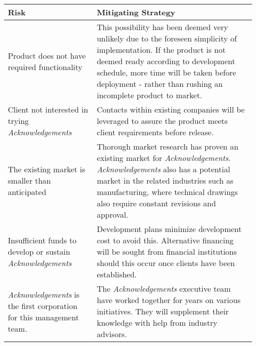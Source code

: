 \begin{center} \begin{tabular}{| p{2in} | p{3.6in} | }
    \hline
    {\bf Risk} & {\bf Mitigating Strategy} \\ \hline
	
	{Product does not have required functionality} & 
	{This possibility has been deemed very unlikely due to the foreseen simplicity of implementation. If the product is not deemed ready according to development schedule, more time will be taken before deployment - rather than rushing an incomplete product to market.} \\ \hline
	
	{\raggedright Client not interested in trying {\it Acknowledgements}} & 
	{Contacts within existing companies will be leveraged to assure the product meets client requirements before release.} \\ \hline
	
	{The existing market is smaller than anticipated} & 
	{Thorough market research has proven an existing market for {\it Acknowledgements}. {\it Acknowledgements} also has a potential market in the related industries such as manufacturing, where technical drawings also require constant revisions and approval.} \\ \hline
	
	{Insufficient funds to develop or sustain {\it Acknowledgements}} & 
	{Development plans minimize development cost to avoid this. Alternative financing will be sought from financial institutions should this occur once clients have been established.} \\ \hline

	{{\it Acknowledgements} is the first corporation for this management team.} & 
	{The {\it Acknowledgements} executive team have worked together for years on various initiatives. They will supplement their knowledge with help from industry advisors.} \\ \hline
\end{tabular} \end{center}
